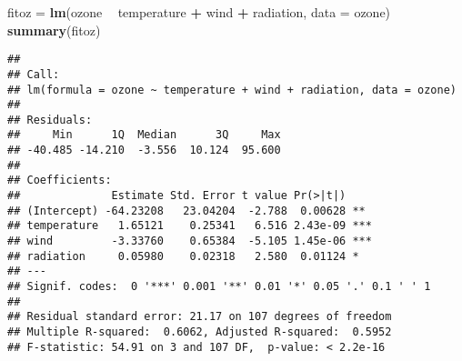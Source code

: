 \documentclass[ignorenonframetext,]{beamer}
\newenvironment{Shaded}{\begin{snugshade}}{\end{snugshade}}
\newcommand{\KeywordTok}[1]{\textcolor[rgb]{0.13,0.29,0.53}{\textbf{#1}}}
\newcommand{\DataTypeTok}[1]{\textcolor[rgb]{0.13,0.29,0.53}{#1}}
\newcommand{\StringTok}[1]{\textcolor[rgb]{0.31,0.60,0.02}{#1}}
\newcommand{\OperatorTok}[1]{\textcolor[rgb]{0.81,0.36,0.00}{\textbf{#1}}}
\newcommand{\NormalTok}[1]{#1}
\begin{document}
\begin{frame}[fragile]

\footnotesize

\begin{Shaded}
\begin{Highlighting}[]
\NormalTok{fitoz =}\StringTok{ }\KeywordTok{lm}\NormalTok{(ozone }\OperatorTok{~}\StringTok{ }\NormalTok{temperature }\OperatorTok{+}\StringTok{ }\NormalTok{wind }\OperatorTok{+}\StringTok{ }\NormalTok{radiation, }\DataTypeTok{data =}\NormalTok{ ozone)}
\KeywordTok{summary}\NormalTok{(fitoz)}
\end{Highlighting}
\end{Shaded}

\begin{verbatim}
## 
## Call:
## lm(formula = ozone ~ temperature + wind + radiation, data = ozone)
## 
## Residuals:
##     Min      1Q  Median      3Q     Max 
## -40.485 -14.210  -3.556  10.124  95.600 
## 
## Coefficients:
##              Estimate Std. Error t value Pr(>|t|)    
## (Intercept) -64.23208   23.04204  -2.788  0.00628 ** 
## temperature   1.65121    0.25341   6.516 2.43e-09 ***
## wind         -3.33760    0.65384  -5.105 1.45e-06 ***
## radiation     0.05980    0.02318   2.580  0.01124 *  
## ---
## Signif. codes:  0 '***' 0.001 '**' 0.01 '*' 0.05 '.' 0.1 ' ' 1
## 
## Residual standard error: 21.17 on 107 degrees of freedom
## Multiple R-squared:  0.6062, Adjusted R-squared:  0.5952 
## F-statistic: 54.91 on 3 and 107 DF,  p-value: < 2.2e-16
\end{verbatim}

\normalsize

\end{frame}
\end{document}
